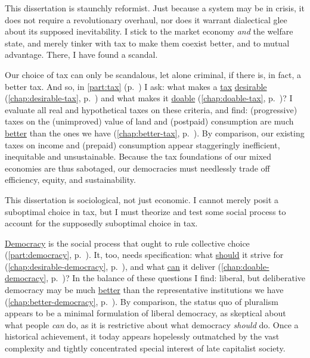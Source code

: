 This dissertation is staunchly reformist. 
Just because a system may be in crisis, it does not require a revolutionary overhaul, nor does it warrant dialectical glee about its supposed inevitability. 
I stick to the market economy \emph{and} the welfare state, and merely tinker with tax to make them coexist better, and to mutual advantage. 
There, I have found a scandal. %

Our choice of tax can only be scandalous, let alone criminal, if there is, in fact, a better tax. 
And so, in \autoref{part:tax} (p.~\pageref{part:tax}) I ask: what makes a \hyperref[part:tax]{tax} \hyperref[chap:desirable-tax]{desirable} (\autoref{chap:desirable-tax}, p.~\pageref{chap:desirable-tax}) and what makes it \hyperref[chap:doable-tax]{doable} (\autoref{chap:doable-tax}, p.~\pageref{chap:doable-tax})?
I evaluate all real and hypothetical taxes on these criteria, and find: (progressive) taxes on the (unimproved) value of land and (postpaid) consumption are much \hyperref[chap:better-tax]{better} than the ones we have (\autoref{chap:better-tax}, p.~\pageref{chap:better-tax}). 
By comparison, our existing taxes on income and (prepaid) consumption appear staggeringly inefficient, inequitable and unsustainable. %
Because the tax foundations of our mixed economies are thus sabotaged, our democracies must needlessly trade off efficiency, equity, and sustainability.

This dissertation is sociological, not just economic. 
I cannot merely posit a suboptimal choice in tax, but I must theorize and test some social process to account for the supposedly suboptimal choice in tax. 

\hyperref[part:democracy]{Democracy} is the social process that ought to rule collective choice (\autoref{part:democracy}, p.~\pageref{part:democracy}). 
It, too, needs specification: what \hyperref[chap:desirable-democracy]{should} it strive for (\autoref{chap:desirable-democracy}, p.~\pageref{chap:desirable-democracy}), and what \hyperref[chap:doable-democracy]{can} it deliver (\autoref{chap:doable-democracy}, p.~\pageref{chap:doable-democracy})? 
In the balance of these questions I find: liberal, but deliberative democracy may be much \hyperref[chap:better-democracy]{better} than the representative institutions we have (\autoref{chap:better-democracy}, p.~\pageref{chap:better-democracy}). 
By comparison, the status quo of pluralism appears to be a minimal formulation of liberal democracy, as skeptical about what people \emph{can} do, as it is restrictive about what democracy \emph{should} do. 
Once a historical achievement, it today appears hopelessly outmatched by the vast complexity and tightly concentrated special interest of late capitalist society.

